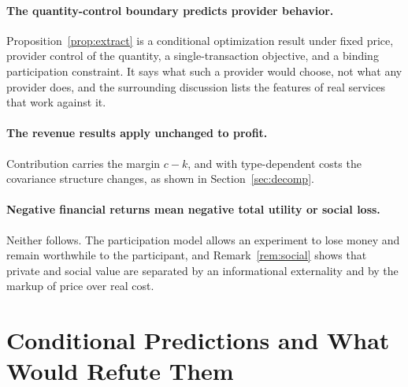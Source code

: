 \documentclass[11pt]{article}
\theoremstyle{remark}
\begin{document}
\paragraph{The quantity-control boundary predicts provider behavior.} Proposition~\ref{prop:extract} is a conditional optimization result under fixed price, provider control of the quantity, a single-transaction objective, and a binding participation constraint. It says what such a provider would choose, not what any provider does, and the surrounding discussion lists the features of real services that work against it.

\paragraph{The revenue results apply unchanged to profit.} Contribution carries the margin $c-k$, and with type-dependent costs the covariance structure changes, as shown in Section~\ref{sec:decomp}.

\paragraph{Negative financial returns mean negative total utility or social loss.} Neither follows. The participation model allows an experiment to lose money and remain worthwhile to the participant, and Remark~\ref{rem:social} shows that private and social value are separated by an informational externality and by the markup of price over real cost.

\section{Conditional Predictions and What Would Refute Them}\label{sec:pred}
\end{document}
